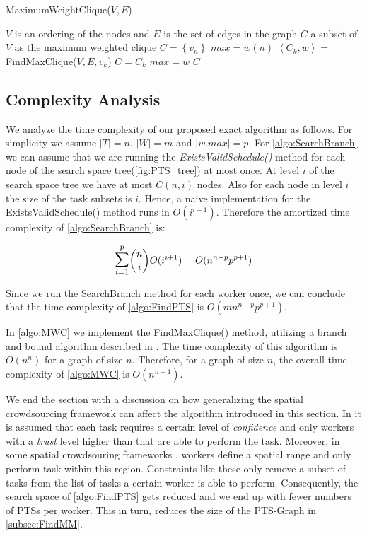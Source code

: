 \begin{algorithm}
\caption{MaximumWeightClique($V, E$)}
\label{algo:MWC}
\begin{algorithmic}[1]
\REQUIRE $V$ is an ordering of the nodes and $E$ is the set of edges in the graph
\ENSURE $C$ a subset of $V$ as the maximum weighted clique
\STATE $C = \left\{ v_n \right\}$
\STATE $max = w(n)$
	\STATE $\left\langle C_k, w \right\rangle =$ FindMaxClique($V, E, v_k$)
		\STATE $C = C_k$
		\STATE $max = w$
	\ENDIF
\ENDFOR
\RETURN $C$
\end{algorithmic}
\end{algorithm}

\subsection{Complexity Analysis}
\label{subsec:exactcomplexity}

We analyze the time complexity of our proposed exact algorithm as follows. For simplicity we assume $\left\vert T \right\vert = n$, $\left\vert W \right\vert = m$ and $\left\vert w.max \right\vert = p$. For \cref{algo:SearchBranch} we can assume that we are running the \textit{ExistsValidSchedule()} method for each node of the search space tree(\cref{fig:PTS_tree}) at most once. At level $i$ of the search space tree we have at most $C(n,i)$ nodes. Also for each node in level $i$ the size of the task subsets is $i$. Hence, a naive implementation for the ExistsValidSchedule() method runs in $O(i^{i+1})$. Therefore the amortized time complexity of \cref{algo:SearchBranch} is:

\begin{equation*}
\mathlarger{\mathlarger{\sum}}_{i = 1}^{p} \dbinom{n}{i} O(i^{i+1}) = O(n^{n-p}p^{p+1})
\end{equation*}

Since we run the SearchBranch method for each worker once, we can conclude that the time complexity of \cref{algo:FindPTS} is $O(mn^{n-p}p^{p+1})$.

In \cref{algo:MWC} we implement the FindMaxClique() method, utilizing a branch and bound algorithm described in \cite{Ostergard01}. The time complexity of this algorithm is $O(n^n)$ for a graph of size $n$. Therefore, for a graph of size $n$, the overall time complexity of \cref{algo:MWC} is $O(n^{n+1})$.

We end the section with a discussion on how generalizing the spatial crowdsourcing framework can affect the algorithm introduced in this section. In \cite{Kazemi13} it is assumed that each task requires a certain level of \emph{confidence} and only workers with a \emph{trust} level higher than that are able to perform the task. Moreover, in some spatial crowdsouring frameworks \cite{Kazemi12,Kazemi13,Deng13}, workers define a spatial range and only perform task within this region. Constraints like these only remove a subset of tasks from the list of tasks a certain worker is able to perform. Consequently, the search space of \cref{algo:FindPTS} gets reduced and we end up with fewer numbers of PTSs per worker. This in turn, reduces the size of the PTS-Graph in \cref{subsec:FindMM}.